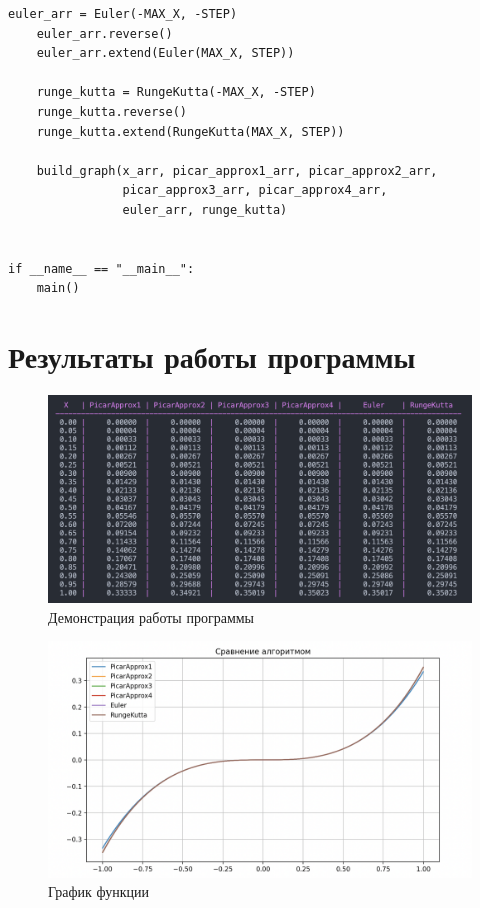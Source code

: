 \documentclass[a4paper,14pt, unknownkeysallowed]{extreport}
\begin{document}
\begin{center}
\begin{lstlisting}[label=lst:parallel_processing,caption=Исходный код алгоритмов]
	euler_arr = Euler(-MAX_X, -STEP)
	euler_arr.reverse()
	euler_arr.extend(Euler(MAX_X, STEP))

	runge_kutta = RungeKutta(-MAX_X, -STEP)
	runge_kutta.reverse()
	runge_kutta.extend(RungeKutta(MAX_X, STEP))

	build_graph(x_arr, picar_approx1_arr, picar_approx2_arr, 
				picar_approx3_arr, picar_approx4_arr, 
				euler_arr, runge_kutta)


if __name__ == "__main__":
	main()

\end{lstlisting}
\end{center}


\chapter{Результаты работы программы}

\begin{figure}[h]
	\centering
	\includegraphics[scale=0.45]{img/table.png}
	\caption{Демонстрация работы программы}
	\label{fig:table}
\end{figure}

\begin{figure}[h]
	\centering
	\includegraphics[scale=0.49]{img/graph.png}
	\caption{График функции}
	\label{fig:graph}
\end{figure}
\end{document}

